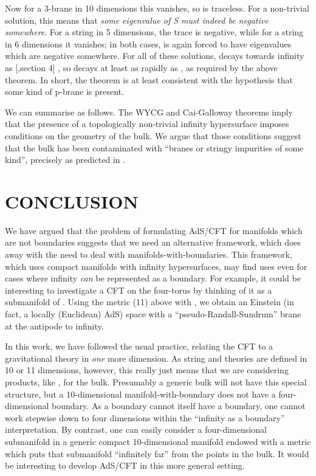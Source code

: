 \documentclass[a4paper,12pt]{article}
\theoremstyle{definition}
\renewcommand{\u}{\textit}
\renewcommand{\-}{\myHighlight{$\dfrac{\quad\enspace}{\quad}$}\coordHE{}}
\begin{document}
Now for a 3-brane in 10 dimensions this vanishes, so \coordHE{} is traceless. For a non-trivial
solution, this means that \u{some eigenvalue of S must indeed be negative somewhere}. For
a string in 5 dimensions, the trace is negative, while for a string in 6 dimensions it
vanishes; in both cases, \coordHE{} is again forced to have eigenvalues which are negative somewhere.
For all of these solutions, \coordHE{} decays towards infinity as [\cite{22},section 4] 
\coordHE{}, so \coordHE{} decays at least as rapidly as \coordHE{}, as required by the above 
theorem. In short, the theorem is at least consistent with the hypothesis that some kind
of p-brane is present.

We can summarise as follows. The WYCG and Cai-Galloway theorems imply that the presence
of a topologically non-trivial infinity hypersurface imposes conditions on the geometry
of the bulk. We argue that those conditions suggest that the bulk has been contaminated
with ``branes or stringy impurities of some kind'', precisely as predicted in \cite{3}.

\section{\large CONCLUSION}

We have argued that the problem of formulating AdS/CFT for manifolds which are not boundaries suggests that we need an alternative framework, which does away with the need to deal with manifolds-with-boundaries. This framework, which uses compact manifolds with infinity hypersurfaces, may find uses even for cases where infinity \u{can} be represented as a boundary. For example, it could be interesting to investigate a CFT on the four-torus \coordHE{} by thinking of it as a submanifold of \coordHE{}. Using the metric (11) above with \coordHE{}, we obtain an Einstein (in fact, a locally (Euclidean) AdS) space with a ``pseudo-Randall-Sundrum'' brane at the antipode to infinity.

In this work, we have followed the usual practice, relating the CFT to a gravitational theory in \u{one} more dimension. As string and \coordHE{} theories are defined in 10 or 11 dimensions, however, this really just means that we are considering products, like \coordHE{}, for the bulk. Presumably a generic bulk will not have this special structure, but a 10-dimensional manifold-with-boundary does not have a four-dimensional boundary. As a boundary cannot itself have a boundary, one cannot work stepwise down to four dimensions within the ``infinity as a boundary'' interpretation. By contrast, one can easily consider a four-dimensional submanifold in a generic compact 10-dimensional manifold endowed with a metric which puts that submanifold ``infinitely far'' from the points in the bulk. It would be interesting to develop AdS/CFT in this more general setting.
\end{document}
